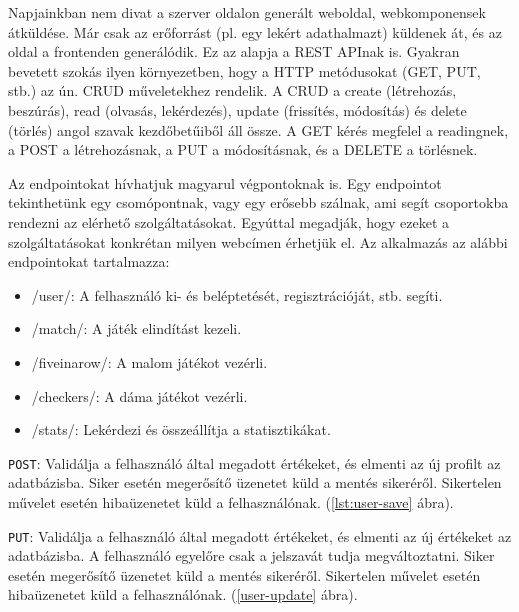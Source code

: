 Napjainkban nem divat a szerver oldalon generált weboldal, webkomponensek átküldése. Már csak az erőforrást (pl. egy lekért adathalmazt) küldenek át, és az oldal a frontenden generálódik. Ez az alapja a REST APInak is. Gyakran bevetett szokás ilyen környezetben, hogy a HTTP metódusokat (GET, PUT, stb.) az ún. CRUD műveletekhez rendelik. A CRUD a create (létrehozás, beszúrás), read (olvasás, lekérdezés), update (frissítés, módosítás) és delete (törlés) angol szavak kezdőbetűiből áll össze. A GET kérés megfelel a readingnek, a POST a létrehozásnak, a PUT a módosításnak, és a DELETE a törlésnek.

Az endpointokat hívhatjuk magyarul végpontoknak is. Egy endpointot tekinthetünk egy csomópontnak, vagy egy erősebb szálnak, ami segít csoportokba rendezni az elérhető szolgáltatásokat. Egyúttal megadják, hogy ezeket a szolgáltatásokat konkrétan milyen webcímen érhetjük el. Az alkalmazás az alábbi endpointokat tartalmazza:
\begin{itemize}
	\item /user/: A felhasználó ki- és beléptetését, regisztrációját, stb. segíti.
	\item /match/: A játék elindítást kezeli.
	\item /fiveinarow/: A malom játékot vezérli.
	\item /checkers/: A dáma játékot vezérli.
	\item /stats/: Lekérdezi és összeállítja a statisztikákat.
\end{itemize}



\texttt{POST}: Validálja a felhasználó által megadott értékeket, és elmenti az új profilt az adatbázisba.
Siker esetén megerősítő üzenetet küld a mentés sikeréről.
Sikertelen művelet esetén hibaüzenetet küld a felhasználónak. (\ref{lst:user-save} ábra).



\texttt{PUT}: Validálja a felhasználó által megadott értékeket, és elmenti az új értékeket az adatbázisba. A felhasználó egyelőre csak a jelszavát tudja megváltoztatni.
Siker esetén megerősítő üzenetet küld a mentés sikeréről.
Sikertelen művelet esetén hibaüzenetet küld a felhasználónak. (\ref{user-update} ábra).



